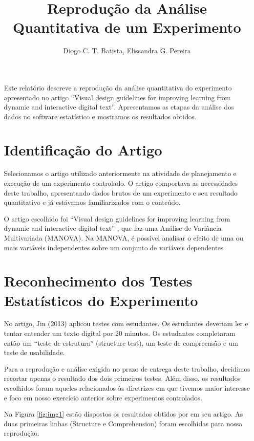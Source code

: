 \documentclass[12pt]{article}
\title{Reprodução da Análise Quantitativa de um Experimento}
\author{Diogo C. T. Batista\inst{1}, Elissandra G. Pereira\inst{1}}
\begin{document}
\maketitle

\begin{resumo}
Este relatório descreve a reprodução da análise quantitativa do experimento apresentado no artigo ``Visual design guidelines for improving learning from dynamic and interactive digital text''. Apresentamos as etapas da análise dos dados no software estatístico e mostramos os resultados obtidos.
\end{resumo}

\section{Identificação do Artigo}

Selecionamos o artigo utilizado anteriormente na atividade de planejamento e execução de um experimento controlado. O artigo comportava as necessidades deste trabalho, apresentando dados brutos de um experimento e seu resultado quantitativo e já estávamos familiarizados com o conteúdo.

O artigo escolhido foi ``Visual design guidelines for improving learning from dynamic and interactive digital text'' \cite{JIN2013248}, que faz uma Análise de Variância Multivariada (MANOVA). Na MANOVA, é possível analisar o efeito de uma ou mais variáveis independentes sobre um conjunto de variáveis dependentes \cite{CHAGAS}

\section{Reconhecimento dos Testes Estatísticos do Experimento}

No artigo, Jin (2013) aplicou testes com estudantes. Os estudantes deveriam ler e tentar entender um texto digital por 20 minutos. Os estudantes completaram então um ``teste de estrutura'' (structure test), um teste de compreensão e um teste de usabilidade.

Para a reprodução e análise exigida no prazo de entrega deste trabalho, decidimos recortar apenas o resultado dos dois primeiros testes. Além disso, os resultados escolhidos foram aqueles relacionados às diretrizes em que tivemos maior interesse e foco em nosso exercício anterior sobre experimentos controlados.

Na Figura \ref{fig:img1} estão dispostos os resultados obtidos por \cite{JIN2013248} em seu artigo. As duas primeiras linhas (Structure e Comprehension) foram escolhidas para nossa reprodução.
\end{document}
